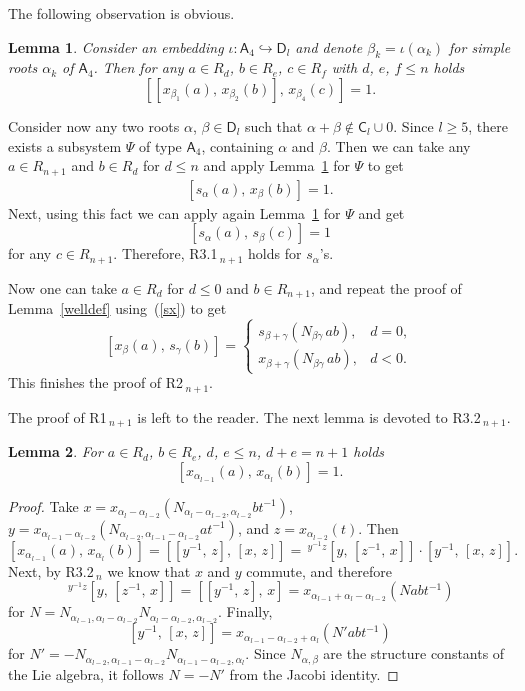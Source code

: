\documentclass[oneside, 8pt]{amsart}
\newtheorem{lemma}{Lemma}
\theoremstyle{remark}
\theoremstyle{definition}
\newcommand{\inv}{^{-1}}
\newcommand{\rA}{\mathsf{A}}
\newcommand{\rC}{\mathsf{C}}
\newcommand{\rD}{\mathsf{D}}
\numberwithin{equation}{section}
\begin{document}
The following observation is obvious.

\begin{lemma}
\label{commute}
Consider an embedding $\iota\colon\rA_4\hookrightarrow\rD_l$ and denote $\beta_k=\iota(\alpha_k)$ for simple roots $\alpha_k$ of $\rA_4$. Then for any $a\in R_d$, $b\in R_e$, $c\in R_f$ with $d$, $e$, $f\leq n$ holds
$$
[[x_{\beta_1}(a),\,x_{\beta_2}(b)],\,x_{\beta_4}(c)]=1.
$$
\end{lemma}

Consider now any two roots $\alpha$, $\beta\in\rD_l$ such that $\alpha+\beta\not\in\rC_l\cup0$. Since $l\geq5$, there exists a subsystem $\Psi$ of type $\rA_4$, containing $\alpha$ and $\beta$. Then we can take any $a\in R_{n+1}$ and $b\in R_d$ for $d\leq n$ and apply Lemma~\ref{commute} for $\Psi$ to get
\setcounter{equation}{0}
\renewcommand{\theequation}{\arabic{equation}}
\begin{align}
\label{sx}
[s_\alpha(a),\,x_\beta(b)]=1.
\end{align}
Next, using this fact we can apply again Lemma~\ref{commute} for $\Psi$ and get
$$
[s_\alpha(a),\,s_\beta(c)]=1
$$
for any $c\in R_{n+1}$. Therefore, R3.1$\!\,_{n+1}$ holds for $s_\alpha$'s.

Now one can take $a\in R_d$ for $d\leq0$ and $b\in R_{n+1}$, and repeat the proof of Lemma~\ref{welldef} using~(\ref{sx}) to get
$$
[x_\beta(a),\,s_\gamma(b)]=\begin{cases}s_{\beta+\gamma}(N_{\beta\gamma}\,ab),&d=0,\\x_{\beta+\gamma}(N_{\beta\gamma}\,ab),&d<0.\end{cases}
$$
This finishes the proof of R2$\!\,_{n+1}$.

The proof of R1$\!\,_{n+1}$ is left to the reader. The next lemma is devoted to R3.2$\!\,_{n+1}$.

\begin{lemma}
For $a\in R_d$, $b\in R_e$, $d$, $e\leq n$, $d+e=n+1$ holds
$$
[x_{\alpha_{l-1}}(a),\,x_{\alpha_l}(b)]=1.
$$
\end{lemma}
\begin{proof}
Take $x=x_{\alpha_{l}-\alpha_{l-2}}(N_{\alpha_{l}-\alpha_{l-2},\alpha_{l-2}}bt\inv)$, $y=x_{\alpha_{l-1}-\alpha_{l-2}}(N_{\alpha_{l-2},\alpha_{l-1}-\alpha_{l-2}}at\inv)$, and $z=x_{\alpha_{l-2}}(t)$. Then
$$
[x_{\alpha_{l-1}}(a),\,x_{\alpha_l}(b)]=[[y\inv,\,z],\,[x,\,z]]=\,^{y\inv z}[y,\,[z\inv,\,x]]\cdot[y\inv,\,[x,\,z]].
$$
Next, by R3.2$\!\,_n$ we know that $x$ and $y$ commute, and therefore 
$$
\,^{y\inv z}[y,\,[z\inv,\,x]]=[[y\inv,\,z],\,x]=x_{\alpha_{l-1}+\alpha_{l}-\alpha_{l-2}}(Nabt\inv)
$$
for $N=N_{\alpha_{l-1},\alpha_{l}-\alpha_{l-2}}N_{\alpha_{l}-\alpha_{l-2},\alpha_{l-2}}$. Finally,
$$
[y\inv,\,[x,\,z]]=x_{\alpha_{l-1}-\alpha_{l-2}+\alpha_l}(N'abt\inv)
$$
for $N'=-N_{\alpha_{l-2},\alpha_{l-1}-\alpha_{l-2}}N_{{\alpha_{l-1}-\alpha_{l-2}},\alpha_l}$. Since $N_{\alpha,\beta}$ are the structure constants of the Lie algebra, it follows $N=-N'$ from the Jacobi identity.
\end{proof}
\end{document}

